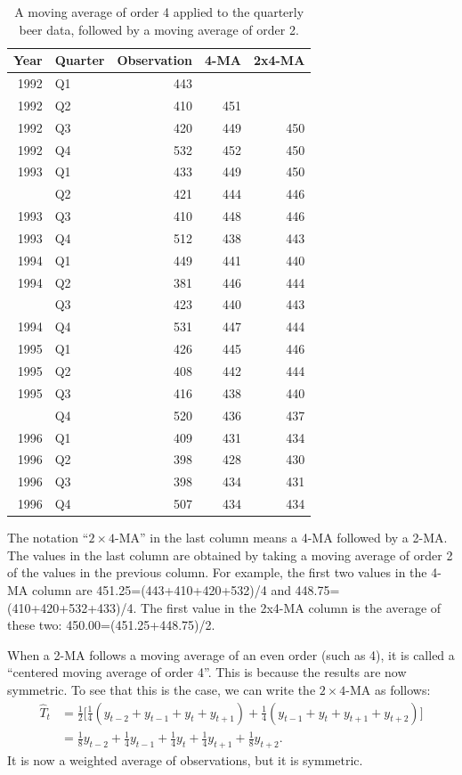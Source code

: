 \documentclass[]{book}
\begin{document}
\begin{table}[t]

\caption{\label{tab:matable}A moving average of order 4 applied to the quarterly beer data, followed by a moving average of order 2.}
\centering
\begin{tabular}{rlrrr}
\toprule
Year & Quarter & Observation & 4-MA & 2x4-MA\\
\midrule
1992 & Q1 & 443 &    &   \\
1992 & Q2 & 410 & 451 &   \\
1992 & Q3 & 420 & 449 & 450\\
1992 & Q4 & 532 & 452 & 450\\
1993 & Q1 & 433 & 449 & 450\\
\addlinespace
1993 & Q2 & 421 & 444 & 446\\
1993 & Q3 & 410 & 448 & 446\\
1993 & Q4 & 512 & 438 & 443\\
1994 & Q1 & 449 & 441 & 440\\
1994 & Q2 & 381 & 446 & 444\\
\addlinespace
1994 & Q3 & 423 & 440 & 443\\
1994 & Q4 & 531 & 447 & 444\\
1995 & Q1 & 426 & 445 & 446\\
1995 & Q2 & 408 & 442 & 444\\
1995 & Q3 & 416 & 438 & 440\\
\addlinespace
1995 & Q4 & 520 & 436 & 437\\
1996 & Q1 & 409 & 431 & 434\\
1996 & Q2 & 398 & 428 & 430\\
1996 & Q3 & 398 & 434 & 431\\
1996 & Q4 & 507 & 434 & 434\\
\bottomrule
\end{tabular}
\end{table}

The notation ``\(2\times4\)-MA'' in the last column means a 4-MA followed by a 2-MA. The values in the last column are obtained by taking a moving average of order 2 of the values in the previous column. For example, the first two values in the 4-MA column are
451.25=(443+410+420+532)/4
and
448.75=(410+420+532+433)/4.
The first value in the 2x4-MA column is the average of these two:
450.00=(451.25+448.75)/2.

When a 2-MA follows a moving average of an even order (such as 4), it is called a ``centered moving average of order 4''. This is because the results are now symmetric. To see that this is the case, we can write the \(2\times4\)-MA as follows:
\begin{align*}
  \hat{T}_{t} &= \frac{1}{2}\Big[
    \frac{1}{4} (y_{t-2}+y_{t-1}+y_{t}+y_{t+1}) +
    \frac{1}{4} (y_{t-1}+y_{t}+y_{t+1}+y_{t+2})\Big] \\
             &= \frac{1}{8}y_{t-2}+\frac14y_{t-1} +
             \frac14y_{t}+\frac14y_{t+1}+\frac18y_{t+2}.
\end{align*}
It is now a weighted average of observations, but it is symmetric.
\end{document}
